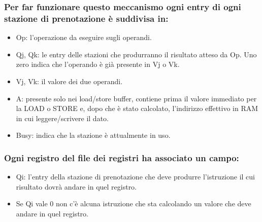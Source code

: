 

\subsubsection{Per far funzionare questo meccanismo ogni entry di ogni stazione di prenotazione è suddivisa in:} 

\begin{itemize}
  \item Op: l'operazione da eseguire sugli operandi. 
  \item Qj, Qk: le entry delle stazioni che produrranno il risultato atteso da Op. Uno zero indica che l'operando è già presente in Vj o Vk. 
  \item Vj, Vk: il valore dei due operandi. 
  \item A: presente solo nei load/store buffer, contiene prima il valore immediato per la LOAD o STORE e, dopo che è stato calcolato, l'indirizzo effettivo in RAM in cui leggere/scrivere il dato. 
  \item Busy: indica che la stazione è attualmente in uso. 
\end{itemize}

\subsubsection{Ogni registro del file dei registri ha associato un campo:}

\begin{itemize}
  \item Qi: l'entry della stazione di prenotazione che deve produrre l'istruzione il cui risultato dovrà andare in quel registro. 
  \item Se Qi vale 0 non c'è alcuna istruzione che sta calcolando un valore che deve andare in quel registro.
\end{itemize}

